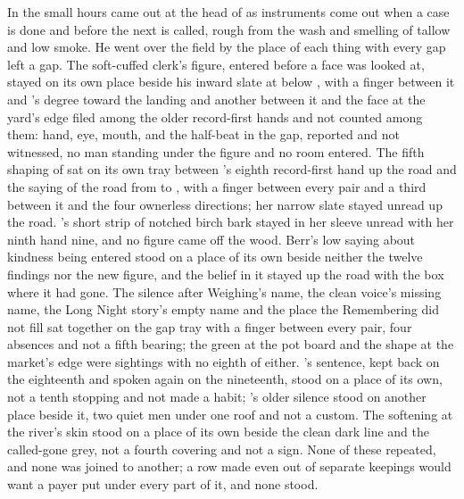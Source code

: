 In the small hours  came out at the head of  as instruments come out when a case is done and before the next is called, rough from the wash and smelling of tallow and low smoke. He went over the field by the place of each thing with every gap left a gap. The soft-cuffed clerk's figure, entered before a face was looked at, stayed on its own place beside his inward slate at  below , with a finger between it and 's degree toward the landing and another between it and the face at the yard's edge filed among the older record-first hands and not counted among them: hand, eye, mouth, and the half-beat in the gap, reported and not witnessed, no man standing under the figure and no room entered. The fifth shaping of  sat on its own tray between 's eighth record-first hand up the road and the saying of the road from  to , with a finger between every pair and a third between it and the four ownerless directions; her narrow slate stayed unread up the road. 's short strip of notched birch bark stayed in her sleeve unread with her ninth hand nine, and no figure came off the wood. Berr's low saying about kindness being entered stood on a place of its own beside neither the twelve findings nor the new figure, and the belief in it stayed up the road with the box where it had gone. The silence after Weighing's name, the clean voice's missing name, the Long Night story's empty name and the place the Remembering did not fill sat together on the gap tray with a finger between every pair, four absences and not a fifth bearing; the green at the pot board and the shape at the market's edge were sightings with no eighth of either. 's sentence, kept back on the eighteenth and spoken again on the nineteenth, stood on a place of its own, not a tenth stopping and not made a habit; 's older silence stood on another place beside it, two quiet men under one roof and not a custom. The softening at the river's skin stood on a place of its own beside the clean dark line and the called-gone grey, not a fourth covering and not a sign. None of these repeated, and none was joined to another; a row made even out of separate keepings would want a payer put under every part of it, and none stood.

